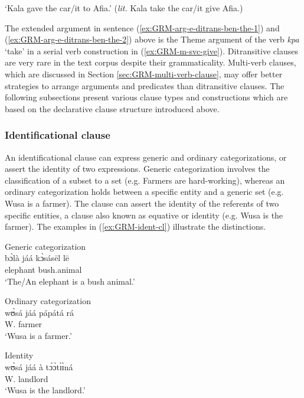 \glt  `Kala gave  the car/it to Afia.' ({\it lit.} Kala take the car/it give
Afia.)
\z

The extended argument in sentence (\ref{ex:GRM-arg-e-ditrans-ben-the-1})  and
(\ref{ex:GRM-arg-e-ditrans-ben-the-2})  above  is the Theme argument 
of the verb
{\it kpa} `take'   in a serial verb construction   
in
(\ref{ex:GRM-m-svc-give}).   Ditransitive clauses are
very rare in the text corpus despite their grammaticality.  Multi-verb
clauses, which are discussed in Section \ref{sec:GRM-multi-verb-clause},
may offer  better strategies to arrange arguments and predicates than
ditransitive clauses. The following subsections present various clause types and
constructions which are based on the declarative clause structure introduced
above.  





\subsubsection{Identificational clause}
\label{sec:GRM-ident-cl}


An identificational clause can express generic and ordinary categorizations, or
assert the identity  of two expressions. Generic categorization involves the 
classification of a subset to a set (e.g. Farmers are hard-working),
whereas an ordinary categorization holds between a specific entity and a generic
set  (e.g.  Wusa is a farmer). The clause can assert the identity of the
referents of two specific entities, a clause also known as equative or identity
(e.g. Wusa is the farmer). The examples in
(\ref{ex:GRM-ident-cl}) illustrate the
distinctions. 

\ea\label{ex:GRM-ident-cl}

\ea\label{ex:GRM-ident-gen-cat}{\rm Generic categorization}\\
\gll
 bɔ̀là jáá kɔ̀sásēl lē\\
 elephant {\ident}  bush.animal {\foc}\\
\glt `The/An elephant is a bush animal.'

\ex\label{ex:GRM-ident-ord-cat}{\rm Ordinary categorization}\\
\gll
wʊ̀sá jáá pápátá rá\\
W. {\ident} farmer {\foc}\\
\glt `Wusa is a farmer.'

\ex\label{ex:GRM-ident-tk-id}{\rm Identity}\\
\gll
wʊ̀sá jáá à tɔ́ɔ̀tɪ̀ɪ̀ná\\
W. {\ident} {\art} landlord\\
\glt `Wusa is the landlord.'

